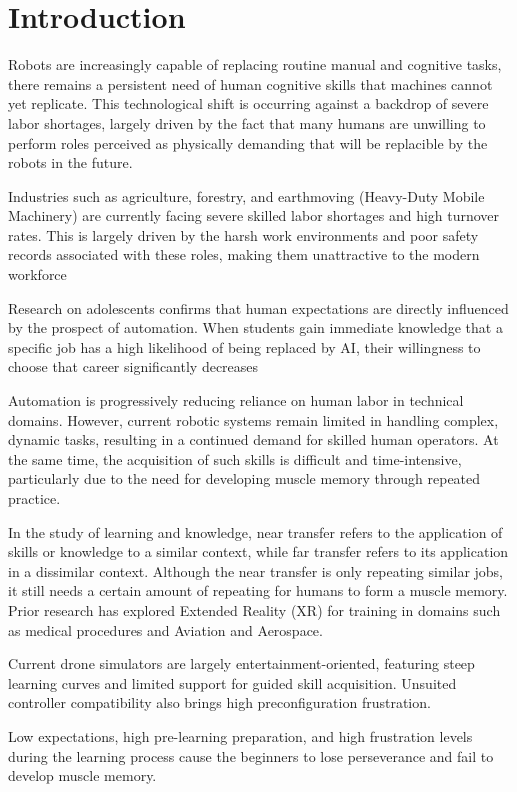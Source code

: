 \section{Introduction}

Robots are increasingly capable of replacing routine manual and cognitive tasks, there remains a persistent need of human cognitive skills that machines cannot yet replicate. This technological shift is occurring against a backdrop of severe labor shortages, largely driven by the fact that many humans are unwilling to perform roles perceived as physically demanding  that will be replacible by the robots in the future.  

Industries such as agriculture, forestry, and earthmoving (Heavy-Duty Mobile Machinery) are currently facing severe skilled labor shortages and high turnover rates. This is largely driven by the harsh work environments and poor safety records associated with these roles, making them unattractive to the modern workforce

Research on adolescents confirms that human expectations are directly influenced by the prospect of automation. When students gain immediate knowledge that a specific job has a high likelihood of being replaced by AI, their willingness to choose that career significantly decreases

Automation is progressively reducing reliance on human labor in technical domains. However, current robotic systems remain limited in handling complex, dynamic tasks, resulting in a continued demand for skilled human operators. At the same time, the acquisition of such skills is difficult and time-intensive, particularly due to the need for developing muscle memory through repeated practice.

In the study of learning and knowledge, near transfer refers to the application of skills or knowledge to a similar context, while far transfer refers to its application in a dissimilar context. Although the near transfer is only repeating similar jobs, it still needs a certain amount of repeating for humans to form a muscle memory.  Prior research has explored Extended Reality (XR) for training in domains such as medical procedures and Aviation and Aerospace. 

Current drone simulators are largely entertainment-oriented, featuring steep learning curves and limited support for guided skill acquisition. Unsuited controller compatibility also brings high preconfiguration frustration.

Low expectations, high pre-learning preparation, and high frustration levels during the learning process cause the beginners to lose perseverance and fail to develop muscle memory. 

